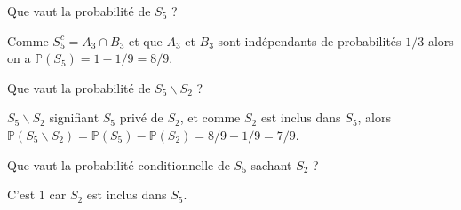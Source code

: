 {\begin{question}
Que vaut la probabilité de $S_5$ ?
\begin{answers}
\end{answers}
\begin{explanations}
Comme $S_5^c = A_3 \cap B_3$ et que $A_3$ et $B_3$ sont indépendants de probabilités $1/3$ alors
on a $\mathbb{P}(S_5) = 1-1/9 = 8/9$.
\end{explanations}
\end{question}

\begin{question}
Que vaut la probabilité de $S_5\backslash S_2$ ?
\begin{answers}
\end{answers}
\begin{explanations}
$S_5\backslash S_2$ signifiant $S_5$ privé de $S_2$, et comme $S_2$ est inclus dans $S_5$, alors
$\mathbb{P}(S_5\backslash S_2) = \mathbb{P}(S_5) - \mathbb{P}(S_2)
= 8/9-1/9 = 7/9$.
\end{explanations}
\end{question}

\begin{question}
Que vaut la probabilité conditionnelle de $S_5$ sachant $S_2$ ?
\begin{answers}
\end{answers}
\begin{explanations}
C'est $1$ car $S_2$ est inclus dans $S_5$.
\end{explanations}
\end{question}
}
